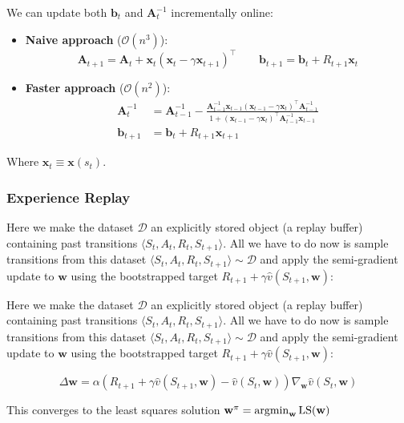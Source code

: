 We can update both $\mathbf{b}_t$ and $\mathbf{A}_t^{-1}$ incrementally online:
\begin{itemize}
    \item \textbf{Naive approach} ($\mathcal{O}(n^3)$):
    \[
        \mathbf{A}_{t+1} = \mathbf{A}_t + \mathbf{x}_t (\mathbf{x}_t - \gamma \mathbf{x}_{t+1})^\top \qquad \mathbf{b}_{t+1} = \mathbf{b}_t + R_{t+1} \mathbf{x}_t
    \]

    \item \textbf{Faster approach} ($\mathcal{O}(n^2)$):
    \begin{align*}
        \mathbf{A}_{t}^{-1} &= \mathbf{A}_{t-1}^{-1} - \frac{\mathbf{A}_{t-1}^{-1} \mathbf{x}_{t-1} (\mathbf{x}_{t-1} - \gamma \mathbf{x}_{t})^\top \mathbf{A}_{t-1}^{-1}}{1 + (\mathbf{x}_{t-1} - \gamma \mathbf{x}_{t})^\top \mathbf{A}_{t-1}^{-1} \mathbf{x}_{t-1}} \\
        \mathbf{b}_{t+1} &= \mathbf{b}_t + R_{t+1} \mathbf{x}_{t+1}
    \end{align*}
\end{itemize}

Where $\mathbf{x}_t \equiv \mathbf{x}(s_t)$.

\subsubsection{Experience Replay}
Here we make the dataset $\mathcal{D}$ an explicitly stored object (a replay buffer) containing past transitions $\langle S_t, A_t, R_t, S_{t+1} \rangle$. All we have to do now is sample transitions from this dataset $\langle S_t, A_t, R_t, S_{t+1} \rangle \sim \mathcal{D}$ and apply the semi-gradient update to $\mathbf{w}$ using the bootstrapped target $R_{t+1} + \gamma \hat{v}(S_{t+1}, \mathbf{w})$:

Here we make the dataset $\mathcal{D}$ an explicitly stored object (a replay buffer) containing past transitions $\langle S_t, A_t, R_t, S_{t+1} \rangle$. All we have to do now is sample transitions from this dataset $\langle S_t, A_t, R_t, S_{t+1} \rangle \sim \mathcal{D}$ and apply the semi-gradient update to $\mathbf{w}$ using the bootstrapped target $R_{t+1} + \gamma \hat{v}(S_{t+1}, \mathbf{w})$:

\[
    \Delta \mathbf{w} = \alpha \left( R_{t+1} + \gamma \hat{v}(S_{t+1}, \mathbf{w}) - \hat{v}(S_t, \mathbf{w}) \right) \nabla_{\mathbf{w}} \hat{v}(S_t, \mathbf{w})
\]

This converges to the least squares solution $\mathbf{w}^\pi = \operatorname*{argmin}_\mathbf{w} \text{LS}(\mathbf{w})$